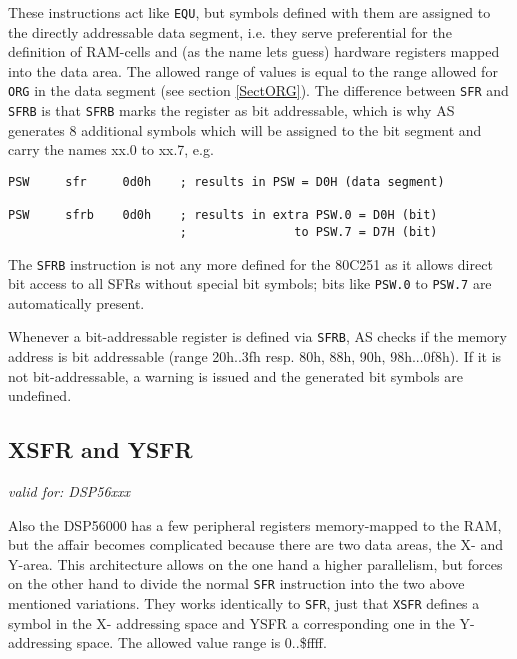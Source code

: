 \documentclass[12pt,twoside]{report}
\makeatletter
\newcommand{\tty}[1]{{\tt #1}}
\newcommand{\ttindex}[1]{\index{#1@{\tt #1}}}
\makeatother
\begin{document}
These instructions act like \tty{EQU}, but symbols defined with them are
assigned to the directly addressable data segment, i.e. they serve
preferential for the definition of RAM-cells and (as the name lets guess)
hardware registers mapped into the data area.  The allowed range of values
is equal to the range allowed for \tty{ORG} in the data segment (see
section \ref{SectORG}).  The difference between \tty{SFR} and \tty{SFRB}
is that \tty{SFRB} marks the register as bit addressable, which is why AS
generates 8 additional symbols which will be assigned to the bit segment
and carry the names xx.0 to xx.7, e.g.
\begin{verbatim}
PSW     sfr     0d0h    ; results in PSW = D0H (data segment)

PSW     sfrb    0d0h    ; results in extra PSW.0 = D0H (bit)
                        ;               to PSW.7 = D7H (bit)
\end{verbatim}
The \tty{SFRB} instruction is not any more defined for the 80C251 as it
allows direct bit access to all SFRs without special bit symbols; bits
like \tty{PSW.0} to \tty{PSW.7} are automatically present.

Whenever a bit-addressable register is defined via \tty{SFRB}, AS checks
if the memory address is bit addressable (range 20h..3fh resp. 80h, 88h,
90h, 98h...0f8h).  If it is not bit-addressable, a warning is issued and
the generated bit symbols are undefined.


\subsection{XSFR and YSFR}
\ttindex{XSFR}\ttindex{YSFR}

{\em valid for: DSP56xxx}

Also the DSP56000 has a few peripheral registers memory-mapped to the RAM,
but the affair becomes complicated because there are two data areas, the
X- and Y-area.  This architecture allows on the one hand a higher
parallelism, but forces on the other hand to divide the normal \tty{SFR}
instruction into the two above mentioned variations.  They works
identically to \tty{SFR}, just that \tty{XSFR} defines a symbol in the X-
addressing space and YSFR a corresponding one in the Y-addressing space.
The allowed value range is 0..\$ffff.

\end{document}
